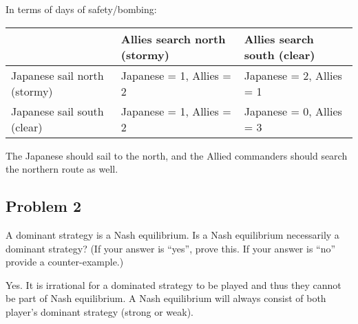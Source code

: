 \documentclass{math}
\begin{document}
In terms of days of safety/bombing:
\begin{center}
  \begin{tabular}{|p{4cm}|p{6cm}|p{6cm}|}
    \hline
    & Allies search north (stormy) & Allies search south (clear) \\
    \hline
    Japanese sail north (stormy) &
      Japanese = 1, Allies = 2 &
      Japanese = 2, Allies = 1 \\
    \hline
    Japanese sail south (clear) &
      Japanese = 1, Allies = 2 &
      Japanese = 0, Allies = 3 \\
    \hline
  \end{tabular}
\end{center}
The Japanese should sail to the north, and the Allied commanders should search
the northern route as well.

\subsection*{Problem 2}
A dominant strategy is a Nash equilibrium. Is a Nash equilibrium necessarily a
dominant strategy? (If your answer is ``yes'', prove this. If your answer is
``no'' provide a counter-example.)
\par Yes. It is irrational for a dominated strategy to be played and thus they
cannot be part of Nash equilibrium. A Nash equilibrium will always consist of
both player's dominant strategy (strong or weak).
\end{document}
